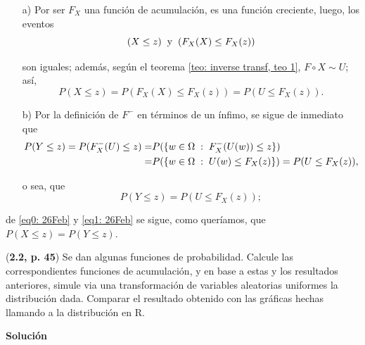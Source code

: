 \begin{itemize}
\item[a)] Por ser $F_{X}$ una función de acumulación, es 
una función creciente, luego, los eventos
\[
(X \leq z) \hspace{0.2cm} \text{y} \hspace{0.2cm} 
(F_{X}(X) \leq F_{X}(z))
\]

son iguales; además, según el teorema 
\ref{teo: inverse transf, teo 1}, $F \circ X \sim U$; así,
\begin{equation}
\label{eq0: 26Feb}
P(X \leq z) = P(F_{X}(X) \leq F_{X}(z)) = P(U \leq F_{X}(z)).
\end{equation}

\item[b)] Por la definición de $F^{-}$ en términos de un 
ínfimo, se sigue de inmediato que
\begin{align*}
P(Y \leq z) = P(F^{-}_{X}(U) \leq z) = & 
P (\{w \in \Omega \hspace{0.1cm} : \hspace{0.1cm} F^{-}_{X}(U(w)) \leq z \}) \\
= & 
P (\{w \in \Omega \hspace{0.1cm} : \hspace{0.1cm} U(w) \leq F_{X}(z) \})
=P(U \leq F_{X}(z)),
\end{align*}

o sea, que 
\begin{equation}
\label{eq1: 26Feb}
P(Y \leq z) = P(U \leq F_{X}(z));
\end{equation}
\end{itemize}

de \eqref{eq0: 26Feb} y \eqref{eq1: 26Feb} se sigue,
como queríamos, que
$P(X \leq z) = P(Y \leq z)$.

\QEDB
\vspace{0.2cm}



\begin{ejercicio}
(\textbf{2.2, p. 45}) Se dan algunas funciones de probabilidad.
Calcule las correspondientes funciones de acumulación, y en base a
estas y los resultados anteriores, simule via una transformación
de variables aleatorias uniformes la distribución dada.
Comparar el resultado obtenido con las gráficas hechas
llamando a la distribución en R.
\end{ejercicio}

\noindent
\textbf{Solución}

